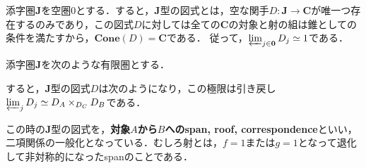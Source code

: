 \documentclass[uplatex, 12pt, dvipdfmx]{jsarticle}
\begin{document}
\begin{example}[終対象]
    添字圏$\mathbf{J}$を空圏$0$とする．すると，$\mathbf{J}$型の図式とは，空な関手$D:\mathbf{J}\to\mathbf{C}$が唯一つ存在するのみであり，この図式$D$に対しては全ての$\mathbf{C}$の対象と射の組は錐としての条件を満たすから，$\mathbf{Cone}(D)=\mathbf{C}$である．
    従って，$\varprojlim_{j\in\mathbf{0}}D_j\simeq 1$である．
\end{example}

\begin{example}[引き戻し]
    添字圏$\mathbf{J}$を次のような有限圏とする．
    \begin{center}
    \end{center}
    すると，$\mathbf{J}$型の図式$D$は次のようになり，この極限は引き戻し$\varprojlim_{j}D_j\simeq D_A\times_{D_C}D_B$である．
    \begin{center}
    \end{center}
\end{example}
\begin{remark*}
    この時の$\mathbf{J}$型の図式を，\textbf{対象$A$から$B$へのspan, roof, correspondence}といい，二項関係の一般化となっている．むしろ射とは，$f=1$または$g=1$となって退化して非対称的になったspanのことである．
\end{remark*}
\end{document}
